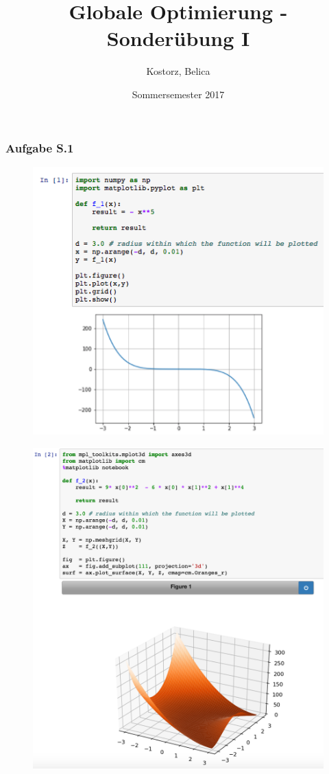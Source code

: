 \documentclass[12pt]{extreport} %
\title{Globale Optimierung - Sonderübung I}
\author{Kostorz, Belica}
\date{Sommersemester 2017}
\theoremstyle{named}
\theoremstyle{nnamed}
\theoremstyle{itshape}
\theoremstyle{normal}
\begin{document}
\thispagestyle{empty}

\thispagestyle{firststyle}
\subsubsection{Aufgabe S.1} 
\begin{figure}[h!]
  \centering
  \includegraphics[scale=0.51]{img/sui-i}
  \label{fig:sub1}
\end{figure} 

\begin{figure}[h!]
  \centering
  \includegraphics[scale=0.41]{img/sui-ii}
  \label{fig:sub2}
\end{figure}
\end{document}

